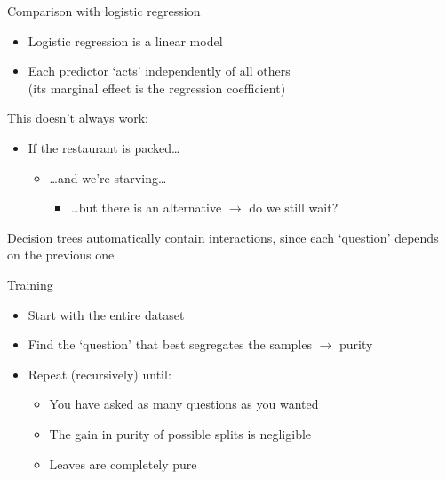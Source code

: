 \begin{frame}{Comparison with logistic regression}
    \begin{itemize}
        \item Logistic regression is a linear model
        \item Each predictor `acts' independently of all others \\
              (its marginal effect is the regression coefficient)
    \end{itemize}
    \vfill\pause
    This doesn't always work:
    \vspace{-0.5em}
    \begin{itemize}
        \item If the restaurant is packed\ldots
              \begin{itemize}
                  \item \ldots and we're starving\ldots
                  \begin{itemize}
                      \item \ldots but \alert{there is} an alternative
                            $\rightarrow$ do we still wait?
                  \end{itemize}
              \end{itemize}
    \end{itemize}
    Decision trees automatically contain \alert{interactions}, since each
    `question' depends on the previous one
\end{frame}

\begin{frame}{Training}
    \begin{itemize}
        \item Start with the entire dataset \\[\bigskipamount]
        \item Find the `question' that best segregates the samples
              $\rightarrow$ \alert{purity} \\[\bigskipamount]
        \item Repeat (recursively) until:
              \begin{itemize}
                  \item You have asked as many questions as you wanted
                  \item The gain in purity of possible splits is negligible
                  \item Leaves are completely pure
              \end{itemize}
    \end{itemize}
\end{frame}

